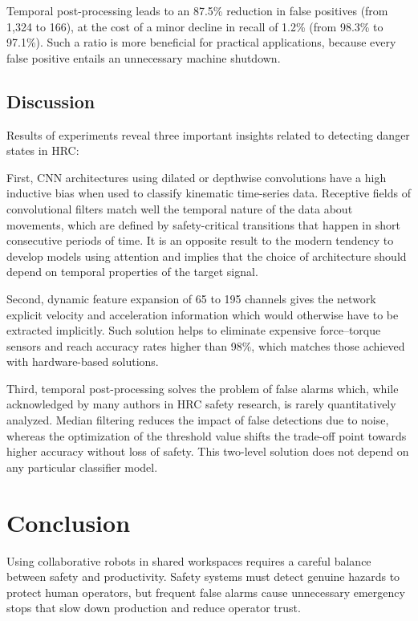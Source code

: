 \documentclass[letterpaper,journal]{IEEEtran}
\begin{document}
Temporal post-processing leads to an 87.5\% reduction in false positives (from 1,324 to 166), at the cost of a minor decline in recall of 1.2\% (from 98.3\% to 97.1\%). Such a ratio is more beneficial for practical applications, because every false positive entails an unnecessary machine shutdown.

\subsection{Discussion}

Results of experiments reveal three important insights related to detecting danger states in HRC:

First, CNN architectures using dilated or depthwise convolutions have a high inductive bias when used to classify kinematic time-series data. Receptive fields of convolutional filters match well the temporal nature of the data about movements, which are defined by safety-critical transitions that happen in short consecutive periods of time. It is an opposite result to the modern tendency to develop models using attention and implies that the choice of architecture should depend on temporal properties of the target signal.

Second, dynamic feature expansion of 65 to 195 channels gives the network explicit velocity and acceleration information which would otherwise have to be extracted implicitly. Such solution helps to eliminate expensive force--torque sensors and reach accuracy rates higher than 98\%, which matches those achieved with hardware-based solutions.

Third, temporal post-processing solves the problem of false alarms which, while acknowledged by many authors in HRC safety research, is rarely quantitatively analyzed. Median filtering reduces the impact of false detections due to noise, whereas the optimization of the threshold value shifts the trade-off point towards higher accuracy without loss of safety. This two-level solution does not depend on any particular classifier model.

\section{Conclusion}\label{sec:conclusion}

Using collaborative robots in shared workspaces requires a careful balance between safety and productivity. Safety systems must detect genuine hazards to protect human operators, but frequent false alarms cause unnecessary emergency stops that slow down production and reduce operator trust.
\end{document}
